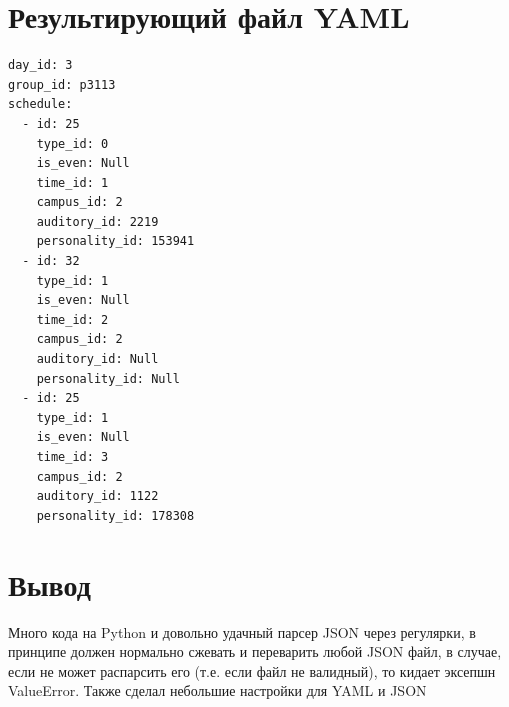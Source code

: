 \documentclass[11pt]{article}
\begin{document}
\section{Результирующий файл YAML}
\label{sec:org9ba754c}
\lstset{language=yaml,label= ,caption= ,captionpos=b,numbers=none}
\begin{lstlisting}
day_id: 3
group_id: p3113
schedule: 
  - id: 25
    type_id: 0
    is_even: Null
    time_id: 1
    campus_id: 2
    auditory_id: 2219
    personality_id: 153941
  - id: 32
    type_id: 1
    is_even: Null
    time_id: 2
    campus_id: 2
    auditory_id: Null
    personality_id: Null
  - id: 25
    type_id: 1
    is_even: Null
    time_id: 3
    campus_id: 2
    auditory_id: 1122
    personality_id: 178308
\end{lstlisting}
\section{Вывод}
\label{sec:orgafbed7d}
\normalsize
Много кода на Python и довольно удачный парсер JSON через регулярки, в принципе должен нормально сжевать и переварить любой JSON файл, в случае, если не может распарсить его (т.е. если файл не валидный), то кидает эксепшн ValueError.
Также сделал небольшие настройки для YAML и JSON
\end{document}
